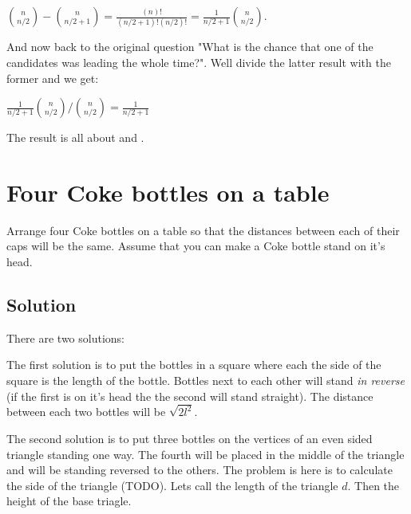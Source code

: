 \documentclass{article}
\begin{document}
${n \choose n/2} - {n \choose n/2+1} = \frac{(n)!}{(n/2+1)!(n/2)!} = \frac{1}{n/2+1}{n \choose n/2}$.

And now back to the original question "What is the chance that one of the candidates was leading the whole time?". Well divide the latter result with the former and we get:

$\frac{1}{n/2+1}{n \choose n/2} / {n \choose n/2} = \frac{1}{n/2+1}$

The result is all about 
and .

\section{Four Coke bottles on a table}

Arrange four Coke bottles on a table so that the distances between each of their caps will be the same. Assume that
you can make a Coke bottle stand on it's head.

\subsection{Solution}

There are two solutions:

The first solution is to put the bottles in a square where each the side of the square is the length of the bottle. Bottles
next to each other will stand \emph{in reverse} (if the first is on it's head the the second will stand straight).
The distance between each two bottles will be $\sqrt{2l^2}$.



The second solution is to put three bottles on the vertices of an even sided triangle standing one way. The fourth will be placed
in the middle of the triangle and will be standing reversed to the others. The problem is here is to calculate the side of the triangle (TODO).
Lets call the length of the triangle $d$. Then the height of the base triagle.



\label{end}
\end{document}
